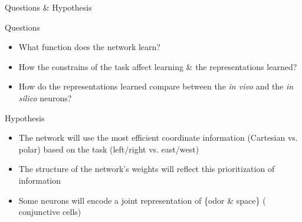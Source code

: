 \documentclass[bigger]{beamer}
\begin{document}
\begin{frame}[label={sec:orga34c87a}]{Questions \& Hypothesis}
\begin{exampleblock}{Questions}
\begin{itemize}
\footnotesize
\setlength\itemsep{0em}
\item What \alert{function} does the network learn?
\item How the constrains of the task affect learning \& the representations learned?
\item How do the representations learned compare between the \emph{in vivo} and the \emph{in silico} neurons?
\end{itemize}
\end{exampleblock}
\pause
\begin{exampleblock}{Hypothesis}
\begin{itemize}
\footnotesize
\setlength\itemsep{0em}
\item The network will use the \alert{most efficient coordinate information} (Cartesian vs. polar) based on the task (left/right vs. east/west)
\item The structure of the network's weights will reflect this prioritization of information
\item Some neurons will encode a \alert{joint representation of \{odor \& space\}} (\ie{} conjunctive cells)
\end{itemize}
\end{exampleblock}
\end{frame}
\end{document}

